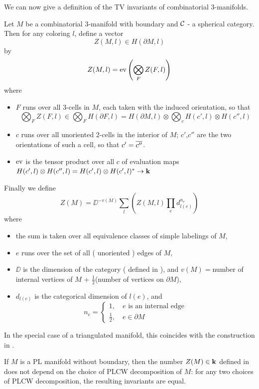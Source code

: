 We can now give a definition of the TV invariants of combinatorial 3-manifolds.

\begin{definition}\label{d:TV_invariant}
	Let $M$ be a combinatorial 3-manifold with boundary and $\mathcal{C}$ - a spherical category. Then for any coloring $l$, 
	define a vector
	\[
		Z(M,l) \in H( \partial M,l)
	\]
	by
	\[
	Z(M,l) = \operatorname{ev}\left( \bigotimes_F Z(F,l) \right)
	\]
	where
	\begin{itemize}
		\item $F$ runs over all 3-cells in $M$, each taken with the induced orientation, so that 
		\[
		\bigotimes_F Z(F,l) \in \bigotimes_F H(\partial F,l) = H(\partial M,l) \otimes \bigotimes_c H(c',l) \otimes H(c'',l)
		\]
		\item $c$ runs over all unoriented 2-cells in the interior of $M$; $c'$,$c''$ are the two orientations of such a cell, so 
		that $c'=\overline{c''}$.
		\item $\operatorname{ev}$ is the tensor product over all $c$ of evaluation maps 
		$H(c',l)\otimes H(c'',l)=H(c',l)\otimes H(c',l)^* \rightarrow \mathbf{k}$
	\end{itemize}
	Finally we define
	\[
	Z(M)= \DD^{-v (M)} \sum_{l} \left(  Z( M,l) \prod_{e} d^{n_e}_{l(e)} \right)
	\]
	where
	\begin{itemize}
		\item the sum is taken over all equivalence classes of simple labelings of $M$,
		\item $e$ runs over the set of all ( unoriented ) edges of $M$,
		\item $\DD$ is the dimension of the category ( defined in ), and $v(M)=$number 
		of internal vertices of $M$ + $\frac{1}{2}$(number of vertices on $\partial M$),
		\item $d_{l(e)} $ is the categorical dimension of $l(e)$, and
		$$ n_e = \begin{cases}
			1,\quad e \text{ is an internal edge}\\
			\tfrac{1}{2},\quad e\in \partial M
		\end{cases}
		$$
	\end{itemize}
\end{definition}

In the special case of a triangulated manifold, this coincides with the construction in \cite{barrett}.

\begin{theorem}\label{t:main1}
	If $M$ is a PL manifold without boundary, then the number $Z(M) \in \mathbf{k}$ defined in  
	does not depend on the choice of PLCW decomposition of $M$: for any two choices of PLCW decomposition, 
	the resulting invariants are equal.
\end{theorem}

